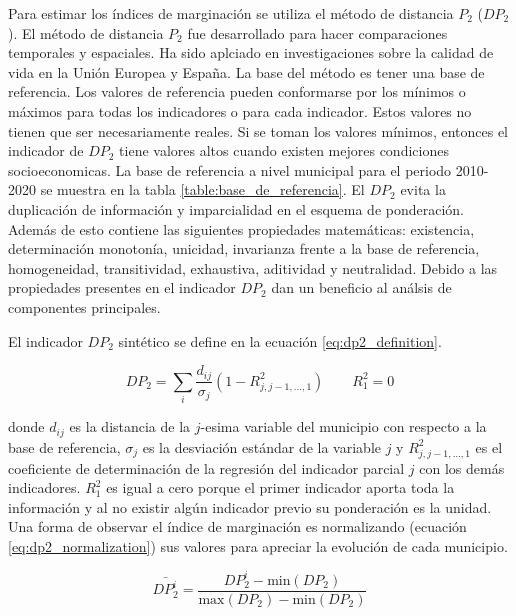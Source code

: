Para estimar los índices de marginación se utiliza el método de distancia $P_2$\cite{Trapero_1977} ($DP_2$). El método de distancia $P_2$ fue desarrollado para hacer comparaciones temporales y espaciales. Ha sido aplciado en investigaciones sobre la calidad de vida en la Unión Europea y España\cite{Somarriba_2008,Zarzoza_2012,Zarzoza_1996,Nayak_2012}. La base del método es tener una base de referencia. Los valores de referencia pueden conformarse por los mínimos o máximos para todas los indicadores o para cada indicador. Estos valores no tienen que ser necesariamente reales. Si se toman los valores mínimos, entonces el indicador de $DP_2$ tiene valores altos cuando existen mejores condiciones socioeconomicas. La base de referencia a nivel municipal para el periodo 2010-2020 se muestra en la tabla \ref{table:base_de_referencia}\cite{CONAPO_2022}. El $DP_2$ evita la duplicación de información y imparcialidad en el esquema de ponderación. Además de esto contiene las siguientes propiedades matemáticas: existencia, determinación monotonía, unicidad, invarianza frente a la base de referencia, homogeneidad, transitividad, exhaustiva, aditividad y neutralidad\cite{Somarriba_2008,Espina_2012}. Debido a las propiedades presentes en el indicador $DP_2$ dan un beneficio al análsis de componentes principales\cite{Somarriba_2008}.



El indicador $DP_2$ sintético se define en la ecuación \ref{eq:dp2_definition}.

\begin{equation}
    DP_2 =  \sum_{i} \frac{d_{ij}}{\sigma_j} (1-R_{j,j-1,\dots,1}^2) \qquad R_1^2=0
    \label{eq:dp2_definition}
\end{equation}

donde $d_{ij}$ es la distancia de la $j$-esima variable del municipio con respecto a la base de referencia, $\sigma_j$ es la desviación estándar de la variable $j$ y $R_{j,j-1,\dots,1}^2$ es el coeficiente de determinación de la regresión del indicador parcial $j$ con los demás indicadores. $R_1^2$ es igual a cero porque el primer indicador aporta toda la información y al no existir algún indicador previo su ponderación es la unidad. Una forma de observar el índice de marginación es normalizando (ecuación \ref{eq:dp2_normalization}) sus valores para apreciar la evolución de cada municipio\cite{Somarriba_2013}.

\begin{equation}
    \bar{DP_2^i} = \frac{DP_2^i-\text{min}(DP_2)}{\text{max}(DP_2)-\text{min}(DP_2)}
    \label{eq:dp2_normalization}
\end{equation}

